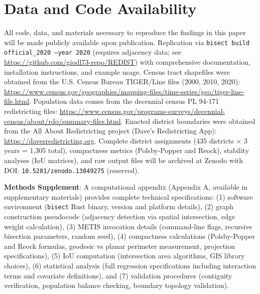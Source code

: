 \documentclass[11pt]{article}
\begin{document}
\section*{Data and Code Availability}
All code, data, and materials necessary to reproduce the findings in this paper will be made publicly available upon publication. Replication via \texttt{bisect build official\_2020 --year 2020} (requires adjacency data; see \url{https://github.com/giodl73-repo/REDIST}) with comprehensive documentation, installation instructions, and example usage. Census tract shapefiles were obtained from the U.S. Census Bureau TIGER/Line files (2000, 2010, 2020): \url{https://www.census.gov/geographies/mapping-files/time-series/geo/tiger-line-file.html}. Population data comes from the decennial census PL 94-171 redistricting files: \url{https://www.census.gov/programs-surveys/decennial-census/about/rdo/summary-files.html}. Enacted district boundaries were obtained from the All About Redistricting project (Dave's Redistricting App): \url{https://davesredistricting.org}. Complete district assignments (435 districts $\times$ 3 years = 1,305 total), compactness metrics (Polsby-Popper and Reock), stability analyses (IoU matrices), and raw output files will be archived at Zenodo with DOI: \texttt{10.5281/zenodo.13849275} (reserved).

\textbf{Methods Supplement}: A computational appendix (Appendix A, available in supplementary materials) provides complete technical specifications: (1) software environment (\texttt{bisect} Rust binary, version and platform details), (2) graph construction pseudocode (adjacency detection via spatial intersection, edge weight calculation), (3) METIS invocation details (command-line flags, recursive bisection parameters, random seed), (4) compactness calculations (Polsby-Popper and Reock formulas, geodesic vs planar perimeter measurement, projection specifications), (5) IoU computation (intersection area algorithms, GIS library choices), (6) statistical analysis (full regression specifications including interaction terms and covariate definitions), and (7) validation procedures (contiguity verification, population balance checking, boundary topology validation).



\end{document}
